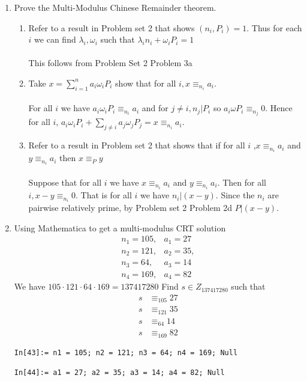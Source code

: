 \documentclass[12pt]{amsart}
\newcommand{\benu}{\begin{enumerate}}
\newcommand{\eenu}{\end{enumerate}}
\theoremstyle{definition}
\begin{document}
\begin{enumerate}
\item Prove the Multi-Modulus Chinese Remainder theorem.
 
\benu 
\item Refer to a result in Problem set 2 that shows $(n_i,P_i)=1$. Thus for each $i$ we can find $\lambda_i,\omega_i$ such that $\lambda_in_i+\omega_iP_i=1$
\\
\\
This follows from Problem Set 2 Problem 3a
\\
\item
Take $x=\sum_{i=1}^na_i\omega_iP_i$ show that for all $i, x\equiv_{n_i}a_i$.
\\\\
For all $i$ we have  $a_i\omega_iP_i\equiv_{n_i} a_i$ and for $j\neq i,n_j|P_i$ so $a_i\omega P_i\equiv_{n_j}0$. Hence for all $i$, $a_i\omega_{i}P_i+\sum_{j\neq i}a_j\omega_jP_j=x\equiv_{n_i} a_i$.
\\
\item Refer to a result in Problem set 2 that shows that if for all $i$ ,$x\equiv_{n_i}a_i$ and $y\equiv_{n_i} a_i$ then $x\equiv_P y$
\\\\
Suppose that for all $i$ we have $x\equiv_{n_i}a_i$ and $y\equiv_{n_i} a_i$. Then for all $i, x-y\equiv_{n_i}0$. That is for all $i$ we have $n_i|(x-y)$. Since the $n_i$ are pairwise relatively prime, by Problem set 2 Problem 2d $P|(x-y)$.

\eenu

\newpage %
\item Using Mathematica to get a multi-modulus CRT solution
\begin{align*}
n_1=105,&a_1=27\\
n_2=121,&a_2=35,\\
n_3=64,&a_3=14\\
n_4=169,&a_4=82
\end{align*}
We have $105\cdot121\cdot 64\cdot 169=137417280$
Find $s \in Z_{137417280}$ such that 
\begin{align*} 
s &\equiv_{105} 27\\
s &\equiv_{121}35\\
s &\equiv_{64} 14\\
s&\equiv_{169}82
\end{align*}

\begin{verbatim}
In[43]:= n1 = 105; n2 = 121; n3 = 64; n4 = 169; Null

In[44]:= a1 = 27; a2 = 35; a3 = 14; a4 = 82; Null


\end{verbatim}
\end{enumerate}
\end{document}
